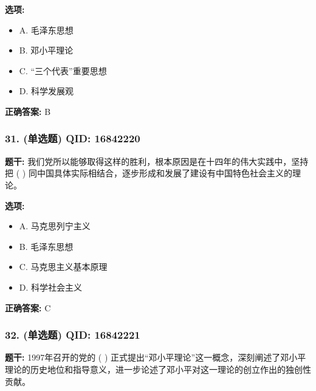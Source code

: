 \documentclass[12pt,UTF8]{ctexart}
\begin{document}
\textbf{选项:}
\begin{itemize}[leftmargin=*]

  \item A. 毛泽东思想

  \item B. 邓小平理论

  \item C. “三个代表”重要思想

  \item D. 科学发展观

\end{itemize}

\textbf{正确答案:}
B

\vspace{0.3em}\hrulefill\vspace{0.7em}

\subsubsection*{31. (单选题) \small QID: 16842220}

\textbf{题干:}
我们党所以能够取得这样的胜利，根本原因是在十四年的伟大实践中，坚持把 ( ) 同中国具体实际相结合，逐步形成和发展了建设有中国特色社会主义的理论。

\textbf{选项:}
\begin{itemize}[leftmargin=*]

  \item A. 马克思列宁主义

  \item B. 毛泽东思想

  \item C. 马克思主义基本原理

  \item D. 科学社会主义

\end{itemize}

\textbf{正确答案:}
C

\vspace{0.3em}\hrulefill\vspace{0.7em}

\subsubsection*{32. (单选题) \small QID: 16842221}

\textbf{题干:}
1997年召开的党的 ( ) 正式提出“邓小平理论”这一概念，深刻阐述了邓小平理论的历史地位和指导意义，进一步论述了邓小平对这一理论的创立作出的独创性贡献。
\end{document}
